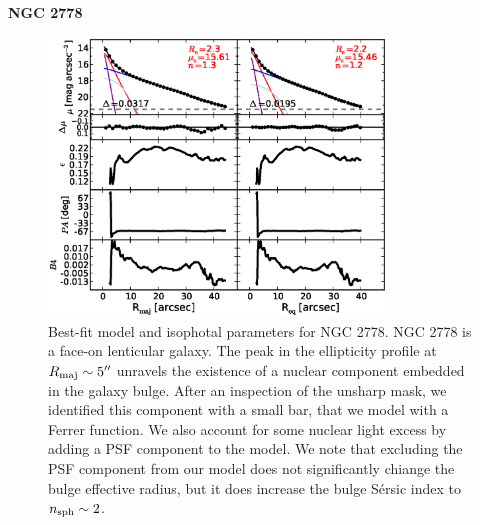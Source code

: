 \documentclass[preprint2]{emulateapj}
\newcommand{\fitfigurewidth}{0.8\textwidth}
\begin{document}
  \clearpage\newpage\noindent
  {\bf NGC 2778 \\}

  \begin{figure}[h]
  \begin{center}
  \includegraphics[width=\fitfigurewidth]{images/n2778_1Dfit.eps}
  \caption{Best-fit model and isophotal parameters for NGC 2778.
  NGC 2778 is a face-on lenticular galaxy. 
  The peak in the ellipticity profile at $R_{\rm maj} \sim 5''$ unravels the existence of a nuclear component 
  embedded in the galaxy bulge.
  After an inspection of the unsharp mask, we identified this component with a small bar,
  that we model with a Ferrer function.
  We also account for some nuclear light excess by adding a PSF component to the model.
  We note that excluding the PSF component from our model does not significantly chiange the 
  bulge effective radius, but it does increase the bulge S\'ersic index to $n_{\rm sph} \sim 2$.
  }
  \end{center}
  \end{figure}
\end{document}
